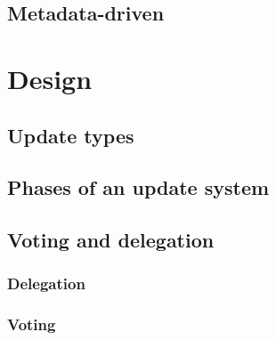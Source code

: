\documentclass[11pt,a4paper]{article}
\begin{document}
\subsection{Metadata-driven}
\label{sec:metadata-driven}

\section{Design}
\label{sec:design}


\subsection{Update types}
\label{sec:update-types}



\subsection{Phases of an update system}
\label{sec:phases-an-update}


\subsection{Voting and delegation}
\label{sec:voting-delegation}

\subsubsection{Delegation}
\label{sec:delegation}


\subsubsection{Voting}
\label{sec:voting}
\end{document}
